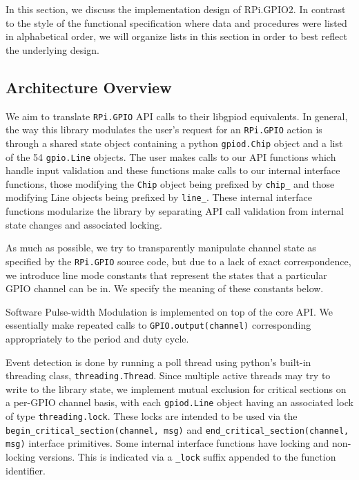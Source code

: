 \documentclass[12pt]{article}
\begin{document}
In this section, we discuss the implementation design of RPi.GPIO2. In contrast to the style of the functional specification where data and procedures were listed in alphabetical order, we will organize lists in this section in order to best reflect the underlying design.

\subsection{Architecture Overview}

We aim to translate \texttt{RPi.GPIO} API calls to their libgpiod equivalents. In general, the way this library modulates the user's request for an \texttt{RPi.GPIO} action is through a shared state object containing a python \texttt{gpiod.Chip} object and a list of the 54 \texttt{gpio.Line} objects. The user makes calls to our API functions which handle input validation and these functions make calls to our internal interface functions, those modifying the \texttt{Chip} object being prefixed by \texttt{chip\_} and those modifying Line objects being prefixed by \texttt{line\_}. These internal interface functions modularize the library by separating API call validation from internal state changes and associated locking.

As much as possible, we try to transparently manipulate channel state as specified by the \texttt{RPi.GPIO} source code, but due to a lack of exact correspondence, we introduce line mode constants that represent the states that a particular GPIO channel can be in. We specify the meaning of these constants below.

Software Pulse-width Modulation is implemented on top of the core API.
We essentially make repeated calls to \texttt{GPIO.output(channel)} corresponding appropriately to the period and duty cycle.

Event detection is done by running a poll thread using python's
built-in threading class, \texttt{threading.Thread}.
Since multiple active threads may try to write to the library state,
we implement mutual exclusion for critical sections on a per-GPIO channel basis,
with each \texttt{gpiod.Line} object having an associated lock of type
\texttt{threading.lock}. These locks are intended to be used via
the \texttt{begin\_critical\_section(channel, msg)} and
\sloppy
\texttt{end\_critical\_section(channel, msg)} interface
primitives. Some internal interface functions have locking and non-locking versions.
This is indicated via a \texttt{\_lock} suffix appended to the function identifier.
\end{document}
